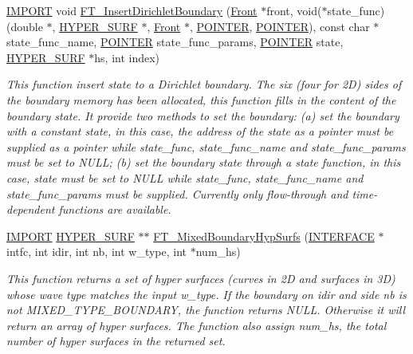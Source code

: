 \begin{DoxyCompactItemize}
\hyperlink{cdecs_8h_a773175d74e73776d69c3e538f17de1ee}{I\+M\+P\+O\+RT} void \hyperlink{group___b_o_u_n_d_a_r_y_ga060be793f512f0fa0217c9fed9484eba}{F\+T\+\_\+\+Insert\+Dirichlet\+Boundary} (\hyperlink{fdecs_8h_ac32202b798f848095c489cfd04c4ca5f}{Front} $\ast$front, void($\ast$state\+\_\+func)(double $\ast$, \hyperlink{int_8h_acef50fa4757ce0d3f75c97fab5a175bc}{H\+Y\+P\+E\+R\+\_\+\+S\+U\+RF} $\ast$, \hyperlink{fdecs_8h_ac32202b798f848095c489cfd04c4ca5f}{Front} $\ast$, \hyperlink{cdecs_8h_ae51a81000f343b8ec43bca1f6a723d7b}{P\+O\+I\+N\+T\+ER}, \hyperlink{cdecs_8h_ae51a81000f343b8ec43bca1f6a723d7b}{P\+O\+I\+N\+T\+ER}), const char $\ast$state\+\_\+func\+\_\+name, \hyperlink{cdecs_8h_ae51a81000f343b8ec43bca1f6a723d7b}{P\+O\+I\+N\+T\+ER} state\+\_\+func\+\_\+params, \hyperlink{cdecs_8h_ae51a81000f343b8ec43bca1f6a723d7b}{P\+O\+I\+N\+T\+ER} state, \hyperlink{int_8h_acef50fa4757ce0d3f75c97fab5a175bc}{H\+Y\+P\+E\+R\+\_\+\+S\+U\+RF} $\ast$hs, int index)
\begin{DoxyCompactList}\small\item\em This function insert state to a Dirichlet boundary. The six (four for 2D) sides of the boundary memory has been allocated, this function fills in the content of the boundary state. It provide two methods to set the boundary\+: (a) set the boundary with a constant state, in this case, the address of the state as a pointer must be supplied as a pointer while state\+\_\+func, state\+\_\+func\+\_\+name and state\+\_\+func\+\_\+params must be set to N\+U\+LL; (b) set the boundary state through a state function, in this case, state must be set to N\+U\+LL while state\+\_\+func, state\+\_\+func\+\_\+name and state\+\_\+func\+\_\+params must be supplied. Currently only flow-\/through and time-\/dependent functions are available. \end{DoxyCompactList}\item 
\hyperlink{cdecs_8h_a773175d74e73776d69c3e538f17de1ee}{I\+M\+P\+O\+RT} \hyperlink{int_8h_acef50fa4757ce0d3f75c97fab5a175bc}{H\+Y\+P\+E\+R\+\_\+\+S\+U\+RF} $\ast$$\ast$ \hyperlink{group___b_o_u_n_d_a_r_y_gaf54c91ffe6263b6da327ef983043a4f8}{F\+T\+\_\+\+Mixed\+Boundary\+Hyp\+Surfs} (\hyperlink{int_8h_a58cf562d0d320a608294b7310ea167dc}{I\+N\+T\+E\+R\+F\+A\+CE} $\ast$intfc, int idir, int nb, int w\+\_\+type, int $\ast$num\+\_\+hs)
\begin{DoxyCompactList}\small\item\em This function returns a set of hyper surfaces (curves in 2D and surfaces in 3D) whose wave type matches the input w\+\_\+type. If the boundary on idir and side nb is not M\+I\+X\+E\+D\+\_\+\+T\+Y\+P\+E\+\_\+\+B\+O\+U\+N\+D\+A\+RY, the function returns N\+U\+LL. Otherwise it will return an array of hyper surfaces. The function also assign num\+\_\+hs, the total number of hyper surfaces in the returned set. \end{DoxyCompactList}\item 
$$
\end{DoxyCompactItemize}
